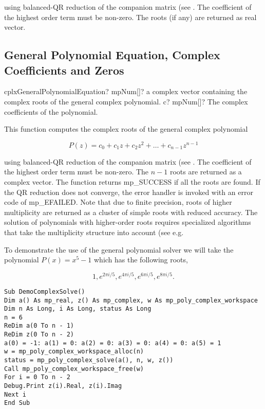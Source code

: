 using balanced-QR reduction of the companion matrix (see \cite{Edelman_1995}. The coefficient of the highest order term must be non-zero. The roots (if any) are returned as  real vector.



\subsection{General Polynomial Equation, Complex Coefficients and Zeros}

\begin{mpFunctionsExtract}
	\mpFunctionOne
	{cplxGeneralPolynomialEquation? mpNum[]? a complex vector containing the complex roots of the general complex polynomial.}
	{c? mpNum[]? The complex coefficients of the polynomial.}
\end{mpFunctionsExtract}



\vspace{0.3cm}
This function computes the complex roots of the general complex polynomial

\begin{equation}
P(z) = c_0 + c_1z + c_2z^2 + \ldots +  c_{n-1} z^{n-1}
\end{equation}

using balanced-QR reduction of the companion matrix (see \cite{Edelman_1995}. The coefficient of the highest order term must be non-zero. The $n-1$ roots are returned as a complex vector.
The function returns mp\_SUCCESS if all the roots are found. If the QR reduction does not converge, the error handler is invoked with an error code of mp\_EFAILED. Note that due to finite precision, roots of higher multiplicity are returned as a cluster of simple roots with reduced accuracy. The solution of polynomials with higher-order roots requires specialized algorithms that take the multiplicity structure into account (see e.g. \cite{Zeng_2004, Zeng2005}


To demonstrate the use of the general polynomial solver we will take the polynomial $P(x) = x^5 - 1$ which has the following roots,

\begin{equation}
1, e^{2\pi i/5}, e^{4\pi i/5},e^{6\pi i/5},e^{8\pi i/5}.
\end{equation}


\begin{lstlisting}
Sub DemoComplexSolve()
Dim a() As mp_real, z() As mp_complex, w As mp_poly_complex_workspace
Dim n As Long, i As Long, status As Long
n = 6
ReDim a(0 To n - 1)
ReDim z(0 To n - 2)
a(0) = -1: a(1) = 0: a(2) = 0: a(3) = 0: a(4) = 0: a(5) = 1
w = mp_poly_complex_workspace_alloc(n)
status = mp_poly_complex_solve(a(), n, w, z())
Call mp_poly_complex_workspace_free(w)
For i = 0 To n - 2
Debug.Print z(i).Real, z(i).Imag
Next i
End Sub
\end{lstlisting}


